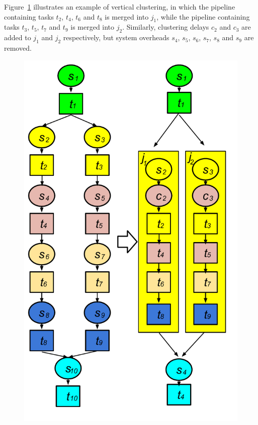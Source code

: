 Figure~\ref{fig:model_vc} illustrates an example of vertical clustering, in which the pipeline containing tasks $t_2$, $t_4$, $t_6$ and $t_8$ is merged into $j_1$, while the pipeline containing tasks $t_3$, $t_5$, $t_7$ and $t_9$ is merged into $j_2$. Similarly, clustering delays $c_2$ and $c_3$ are added to $j_1$ and $j_2$ respectively, but system overheads $s_4$, $s_5$, $s_6$, $s_7$, $s_8$ and $s_9$ are removed. 

\begin{figure}[htb]
\centering
 \includegraphics[width=0.65\linewidth]{figures/model/vc_color.pdf}
  \label{fig:model_vc}
\end{figure}





